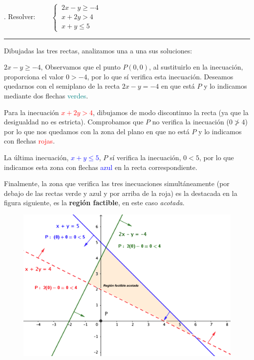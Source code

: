 \vspace{5mm}
\begin{miejemplo}
. 	Resolver: $\qquad \begin{cases}
\ 2x-y\ge -4 \\ \ x+2y>4 \\ \ x+y \le 5	
\end{cases}	$

\vspace{3mm}
\rule{150pt}{0.1pt}
\vspace{3mm}

Dibujadas las tres rectas, analizamos una a una sus soluciones:

\vspace{2mm} $2x-y\ge -4$, Observamos que el punto $P(0,0)$, al sustituirlo en la inecuación, proporciona el valor $0>-4$, por lo que sí verifica esta inecuación. Deseamos quedarnos con el semiplano de la recta $2x-y=-4$ en que está $P$ y lo indicamos mediante dos flechas \textcolor{teal}{verdes}.

\vspace{2mm} Para la inecuación \textcolor{red}{$x+2y>4$}, dibujamos de modo discontinuo la recta (ya que la desigualdad no es estricta). Comprobamos que $P$ no verifica la inecuación ($0 \ngtr 4$) por lo que nos quedamos con la zona del plano en que no está $P$ y lo indicamos con flechas \textcolor{red}{rojas}.

\vspace{2mm} La última inecuación, \textcolor{blue}{$x+y\le 5$}, $P$ sí verifica la inecuación, $0<5$, por lo que indicamos esta zona con flechas \textcolor{blue}{azul} en la recta correspondiente.

\vspace{4mm} Finalmente, la zona que verifica las tres inecuaciones simultáneamente (por debajo de las rectas verde y azul y por arriba de la roja) es la destacada en la figura siguiente, es la \textbf{región factible}, en este caso  \emph{acotada}.



\begin{figure}[H]
	\centering
	\includegraphics[width=.8\textwidth]{imagenes/img08.png}
\end{figure}


\end{miejemplo}
